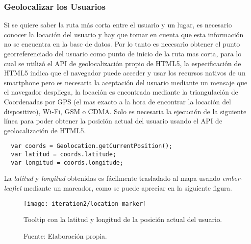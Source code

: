%
%
%



\subsubsection{Geolocalizar los Usuarios}
\label{sub:Manejo de Usuarios}

Si se quiere saber la ruta más corta entre el usuario y un lugar, es necesario conocer la locación del usuario y hay que tomar en cuenta que esta información no se encuentra en la base de datos. Por lo tanto es necesario obtener el punto georreferenciado del usuario como punto de inicio de la ruta mas corta, para lo cual se utilizó el API de geolocalización propio de HTML5, la especificación de HTML5 indica que el navegador puede acceder y usar los recursos nativos de un smartphone pero es necesaria la aceptación del usuario mediante un mensaje que el navegador despliega, la locación es encontrada mediante la triangulación de Coordenadas por GPS (el mas exacto a la hora de encontrar la locación del dispositivo), Wi-Fi, GSM o CDMA. Solo es necesaria la ejecución de la siguiente línea para poder obtener la posición actual del usuario usando el API de geolocalización de HTML5. \\

\begin{verbatim}
  var coords = Geolocation.getCurrentPosition();
  var latitud = coords.latitude;
  var longitud = coords.longitude;
\end{verbatim}

La \emph{latitud} y \emph{longitud} obtenidas es fácilmente trasladado al mapa usando \emph{ember-leaflet} mediante un marcador, como se puede apreciar en la siguiente figura.

\begin{figure}[H]
  \begin{center}
    \texttt{[image: iteration2/location\_marker]}
    \caption{Tooltip con la latitud y longitud de la posición actual del usuario.}
    \label{fig:location_marker}
    \caption*{Fuente: Elaboración propia.}
  \end{center}
\end{figure}



